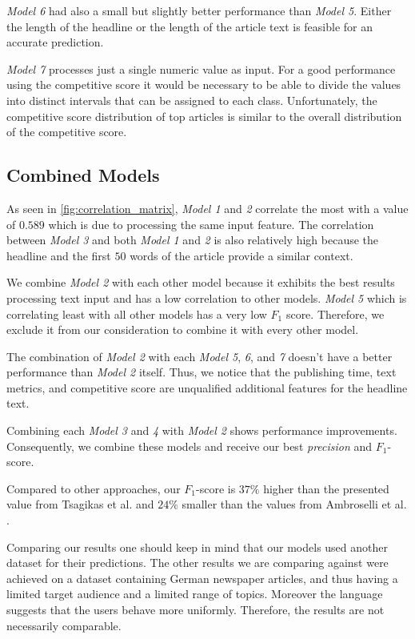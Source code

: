 \textit{Model 6} had also a small but slightly better performance than \textit{Model 5}. 
Either the length of the headline or the length of the article text is feasible for an accurate prediction.

\textit{Model 7} processes just a single numeric value as input. For a good performance using the competitive score it would be necessary to be able to divide the values into distinct intervals that can be assigned to each class.
Unfortunately, the competitive score distribution of top articles is similar to the overall distribution of the competitive score.



\subsection{Combined Models}
As seen in \autoref{fig:correlation_matrix}, \textit{Model 1} and \textit{2} correlate the most with a value of $0.589$ which is due to processing the same input feature.
The correlation between \textit{Model 3} and both \textit{Model 1} and \textit{2} is also relatively high because the headline and the first $50$ words of the article provide a similar context.

We combine \textit{Model 2} with each other model because it exhibits the best results processing text input and has a low correlation to other models.
\textit{Model 5} which is correlating least with all other models has a very low $F_1$ score. Therefore, we exclude it from our consideration to combine it with every other model.

The combination of \textit{Model 2} with each \textit{Model 5}, \textit{6}, and \textit{7} doesn't have a better performance than \textit{Model 2} itself. 
Thus, we notice that the publishing time, text metrics, and competitive score are unqualified additional features for the headline text.

Combining each \textit{Model 3} and \textit{4} with \textit{Model 2} shows performance improvements. Consequently, we combine these models and receive our best \textit{precision} and $F_1$-score.

Compared to other approaches, our $F_1$-score is $37\%$ higher than the presented value from Tsagikas et al. \cite{tsagkias2009predicting} and $24\%$ smaller than the values from Ambroselli et al. \cite{ambroselli2018prediction}. 

Comparing our results one should keep in mind that our models used another dataset for their predictions.
The other results we are comparing against were achieved on a dataset containing German newspaper articles, and thus having a limited target audience and a limited range of topics.
Moreover the language suggests that the users behave more uniformly.
Therefore, the results are not necessarily comparable.

